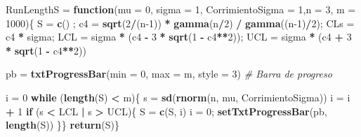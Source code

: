 \documentclass{article}
\newenvironment{Shaded}{\begin{snugshade}}{\end{snugshade}}
\newcommand{\AttributeTok}[1]{\textcolor[rgb]{0.13,0.29,0.53}{#1}}
\newcommand{\CommentTok}[1]{\textcolor[rgb]{0.56,0.35,0.01}{\textit{#1}}}
\newcommand{\ControlFlowTok}[1]{\textcolor[rgb]{0.13,0.29,0.53}{\textbf{#1}}}
\newcommand{\DecValTok}[1]{\textcolor[rgb]{0.00,0.00,0.81}{#1}}
\newcommand{\FunctionTok}[1]{\textcolor[rgb]{0.13,0.29,0.53}{\textbf{#1}}}
\newcommand{\NormalTok}[1]{#1}
\newcommand{\OtherTok}[1]{\textcolor[rgb]{0.56,0.35,0.01}{#1}}
\newcommand{\SpecialCharTok}[1]{\textcolor[rgb]{0.81,0.36,0.00}{\textbf{#1}}}
\begin{document}
\begin{Shaded}
\begin{Highlighting}[]
\NormalTok{RunLengthS }\OtherTok{=} \ControlFlowTok{function}\NormalTok{(}\AttributeTok{mu =} \DecValTok{0}\NormalTok{, }\AttributeTok{sigma =} \DecValTok{1}\NormalTok{, }\AttributeTok{CorrimientoSigma =} \DecValTok{1}\NormalTok{,}\AttributeTok{n =} \DecValTok{3}\NormalTok{, }\AttributeTok{m =} \DecValTok{1000}\NormalTok{)\{}
\NormalTok{  S }\OtherTok{=} \FunctionTok{c}\NormalTok{() ; c4 }\OtherTok{=} \FunctionTok{sqrt}\NormalTok{(}\DecValTok{2}\SpecialCharTok{/}\NormalTok{(n}\DecValTok{{-}1}\NormalTok{)) }\SpecialCharTok{*} \FunctionTok{gamma}\NormalTok{(n}\SpecialCharTok{/}\DecValTok{2}\NormalTok{) }\SpecialCharTok{/} \FunctionTok{gamma}\NormalTok{((n}\DecValTok{{-}1}\NormalTok{)}\SpecialCharTok{/}\DecValTok{2}\NormalTok{); CLs }\OtherTok{=}\NormalTok{ c4 }\SpecialCharTok{*}\NormalTok{ sigma;}
\NormalTok{  LCL }\OtherTok{=}\NormalTok{ sigma }\SpecialCharTok{*}\NormalTok{ (c4 }\SpecialCharTok{{-}} \DecValTok{3} \SpecialCharTok{*} \FunctionTok{sqrt}\NormalTok{(}\DecValTok{1} \SpecialCharTok{{-}}\NormalTok{ c4}\SpecialCharTok{**}\DecValTok{2}\NormalTok{)); UCL }\OtherTok{=}\NormalTok{ sigma }\SpecialCharTok{*}\NormalTok{ (c4 }\SpecialCharTok{+} \DecValTok{3} \SpecialCharTok{*} \FunctionTok{sqrt}\NormalTok{(}\DecValTok{1} \SpecialCharTok{{-}}\NormalTok{ c4}\SpecialCharTok{**}\DecValTok{2}\NormalTok{))}
  
\NormalTok{  pb }\OtherTok{=} \FunctionTok{txtProgressBar}\NormalTok{(}\AttributeTok{min =} \DecValTok{0}\NormalTok{, }\AttributeTok{max =}\NormalTok{ m, }\AttributeTok{style =} \DecValTok{3}\NormalTok{) }\CommentTok{\# Barra de progreso}
  
\NormalTok{  i }\OtherTok{=} \DecValTok{0}
  \ControlFlowTok{while}\NormalTok{ (}\FunctionTok{length}\NormalTok{(S) }\SpecialCharTok{\textless{}}\NormalTok{ m)\{}
\NormalTok{    s }\OtherTok{=} \FunctionTok{sd}\NormalTok{(}\FunctionTok{rnorm}\NormalTok{(n, mu, CorrimientoSigma))}
\NormalTok{    i }\OtherTok{=}\NormalTok{ i }\SpecialCharTok{+} \DecValTok{1}
    \ControlFlowTok{if}\NormalTok{ (s }\SpecialCharTok{\textless{}}\NormalTok{ LCL }\SpecialCharTok{|}\NormalTok{ s }\SpecialCharTok{\textgreater{}}\NormalTok{ UCL)\{}
\NormalTok{      S }\OtherTok{=} \FunctionTok{c}\NormalTok{(S, i)}
\NormalTok{      i  }\OtherTok{=} \DecValTok{0}\NormalTok{; }\FunctionTok{setTxtProgressBar}\NormalTok{(pb, }\FunctionTok{length}\NormalTok{(S))}
\NormalTok{    \}\}}
  \FunctionTok{return}\NormalTok{(S)\}}


\end{Highlighting}
\end{Shaded}
\end{document}
